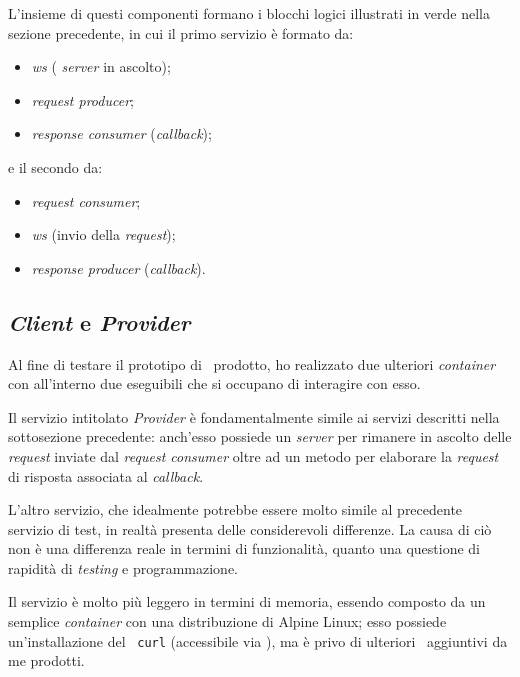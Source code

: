 \noindent
L'insieme di questi componenti formano i blocchi logici illustrati in verde nella sezione precedente, in cui il primo servizio è formato da:
\begin{itemize}
  \item {} \textit{\acrlong{ws}} ( \textit{server} in ascolto);
  \item \textit{request producer};
  \item \textit{response consumer} (\textit{callback});
\end{itemize}
\noindent
e il secondo da:
\begin{itemize}
  \item \textit{request consumer};
  \item {} \textit{\acrlong{ws}} (invio della \textit{request});
  \item \textit{response producer} (\textit{callback}).
\end{itemize}

\subsection{ \textit{Client} e  \textit{Provider} }

Al fine di testare il prototipo di \middleware\ prodotto, ho realizzato due ulteriori \textit{container} con all'interno due eseguibili che si occupano di interagire con esso.

Il servizio intitolato  \textit{Provider} è fondamentalmente simile ai servizi descritti nella sottosezione precedente: anch'esso possiede un  \textit{server} per rimanere in ascolto delle  \textit{request} inviate dal \textit{request consumer} oltre ad un metodo per elaborare la  \textit{request} di risposta associata al \textit{callback}.

L'altro servizio, che idealmente potrebbe essere molto simile al precedente servizio di test, in realtà presenta delle considerevoli differenze.
La causa di ciò non è una differenza reale in termini di funzionalità, quanto una questione di rapidità di \textit{testing} e programmazione.

Il servizio è molto più leggero in termini di memoria, essendo composto da un semplice \textit{container} con una distribuzione di Alpine Linux; esso possiede un'installazione del \software\ \texttt{curl} (accessibile via ), ma è privo di ulteriori \software\ aggiuntivi da me prodotti.

